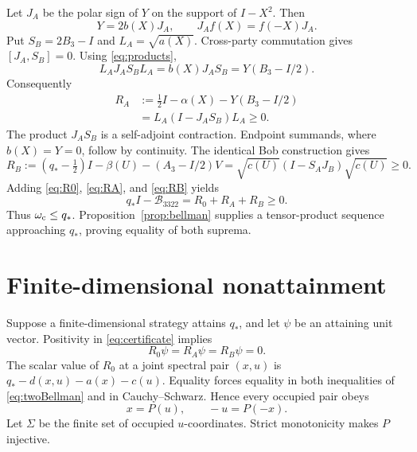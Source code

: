 \documentclass[11pt]{article}
\newcommand{\B}{\mathcal B_{3322}}
\newcommand{\id}{I}
\begin{document}
Let $J_A$ be the polar sign of $Y$ on the support of $\id-X^2$.  Then
\begin{equation}
Y=2b(X)J_A,
\qquad
J_Af(X)=f(-X)J_A.                                  \label{eq:polarA}
\end{equation}
Put $S_B=2B_3-\id$ and $L_A=\sqrt{a(X)}$.  Cross-party commutation gives
$[J_A,S_B]=0$.  Using \eqref{eq:products},
\begin{equation}
L_AJ_AS_BL_A=b(X)J_AS_B=Y(B_3-\id/2).              \label{eq:factorA}
\end{equation}
Consequently
\begin{equation}
\begin{split}
R_A&:=\frac12\id-\alpha(X)-Y(B_3-\id/2)\\
&=L_A(\id-J_AS_B)L_A\ge0.                          \label{eq:RA}
\end{split}
\end{equation}
The product $J_AS_B$ is a self-adjoint contraction.  Endpoint summands, where
$b(X)=Y=0$, follow by continuity.  The identical Bob construction gives
\begin{equation}
R_B:=(q_*-\tfrac12)\id-\beta(U)-(A_3-\id/2)V
=\sqrt{c(U)}(\id-S_AJ_B)\sqrt{c(U)}\ge0.           \label{eq:RB}
\end{equation}
Adding \eqref{eq:R0}, \eqref{eq:RA}, and \eqref{eq:RB} yields
\begin{equation}
\boxed{q_*\id-\B=R_0+R_A+R_B\ge0.}                \label{eq:certificate}
\end{equation}
Thus $\omega_{\rm c}\le q_*$.  Proposition~\ref{prop:bellman} supplies a
tensor-product sequence approaching $q_*$, proving equality of both suprema.

\section{Finite-dimensional nonattainment}

Suppose a finite-dimensional strategy attains $q_*$, and let $\psi$ be an
attaining unit vector.  Positivity in \eqref{eq:certificate} implies
\begin{equation}
R_0\psi=R_A\psi=R_B\psi=0.                          \label{eq:kernels}
\end{equation}
The scalar value of $R_0$ at a joint spectral pair $(x,u)$ is
$q_*-d(x,u)-a(x)-c(u)$.  Equality forces equality in both inequalities of
\eqref{eq:twoBellman} and in Cauchy--Schwarz.  Hence every occupied pair obeys
\begin{equation}
x=P(u),\qquad -u=P(-x).                             \label{eq:zeroGraph}
\end{equation}
Let $\Sigma$ be the finite set of occupied $u$-coordinates.  Strict
monotonicity makes $P$ injective.
\end{document}
